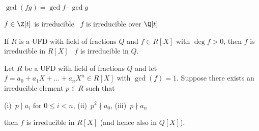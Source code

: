 \documentclass{article}
\begin{document}



\begin{tlemma}[Gauss]
  \( \gcd(fg) = \gcd f \cdot \gcd g\)
\end{tlemma}

\begin{tcorollary}
  \( f\in\Z[t] \) is irreducible \iff~\( f \) is irreducible over \( \Q[t] \)
\end{tcorollary}

\begin{tcorollary}
  If \( R \) is a UFD with field of fractions \( Q \) and \( f \in R[X] \) with \( \deg f > 0 \), then \( f \) is irreducible in \( R[X] \) \iff~\( f \) is irreducible in \( Q \).
\end{tcorollary}

\begin{ttheorem}
  Let \( R \) be a UFD with field of fractions \( Q \) and let \( f=a_0+a_1X+\ldots +a_nX^n \in R[X] \) with \( \gcd(f) = 1 \).
  Suppose there exists an irreducible element \( p \in R \) such that
  \begin{center}
      (i)\ \(p\mid a_i\) for \(0\le i<n\), \qquad
      (ii)\ \(p^2\nmid a_0\), \qquad
      (iii)\ \(p\nmid a_n\)
  \end{center}
  then \( f \) is irreducible in \( R[X] \) (and hence also in \( Q[X] \)).
\end{ttheorem}
\end{document}
